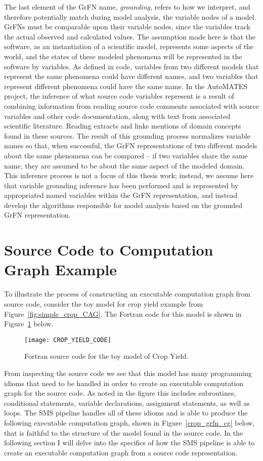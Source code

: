 The last element of the GrFN name, \emph{grounding}, refers to how we interpret, and therefore potentially match during model analysis, the variable nodes of a model.
GrFNs must be comparable upon their variable nodes, since the variables track the actual observed and calculated values.
The assumption made here is that the software, as an instantiation of a scientific model, represents some aspects of the world, and the states of these modeled phenomena will be represented in the software by variables.
As defined in code, variables from two different models that represent the same phenomena could have different names, and two variables that represent different phenomena could have the same name.
In the AutoMATES project, the inference of what source code variables represent is a result of combining information from reading source code comments associated with source variables and other code documentation, along with text from associated scientific literature. Reading extracts and links mentions of domain concepts found in these sources. The result of this grounding process normalizes variable names so that, when successful, the GrFN representations of two different models about the same phenomena can be compared -- if two variables share the same name, they are assumed to be about the same aspect of the modeled domain. This inference process is not a focus of this thesis work; instead, we assume here that variable grounding inference has been performed and is represented by appropriated named variables within the GrFN representation, and instead develop the algorithms responsible for model analysis based on the grounded GrFN representation.

\section{Source Code to Computation Graph Example\label{sec:code_to_cg}}
To illustrate the process of constructing an executable computation graph from source code, consider the toy model for crop yield example from Figure~\ref{fig:simple_crop_CAG}.
The Fortran code for this model is shown in Figure~\ref{crop_code} below.
\FloatBarrier
\begin{figure}[!htbp]
    \label{crop_code}
    \centering
    \texttt{[image: CROP\_YIELD\_CODE]}%
    \caption[Crop Yield Model Source Code]{Fortran source code for the toy model of Crop Yield.}
\end{figure}
\FloatBarrier

From inspecting the source code we see that this model has many programming idioms that need to be handled in order to create an executable computation graph for the source code.
As noted in the figure this includes subroutines, conditional statements, variable declarations, assignment statements, as well as loops.
The SMS pipeline handles all of these idioms and is able to produce the following executable computation graph, shown in Figure~\ref{crop_grfn_cg} below, that is faithful to the structure of the model found in the source code. In the following section I will delve into the specifics of how the SMS pipeline is able to create an executable computation graph from a source code representation.

